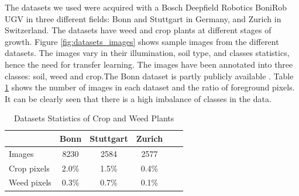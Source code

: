 \documentclass[letterpaper, 10 pt, conference]{ieeeconf}  %
\begin{document}
The datasets we used were acquired with a Bosch Deepfield Robotics BoniRob UGV in three different fields: Bonn and Stuttgart in Germany, and Zurich in Switzerland. The datasets have weed and crop plants at different stages of growth. Figure \ref{fig:datasets_images} shows sample images from the different datasets. The images vary in their illumination, soil type, and classes statistics, hence the need for transfer learning. The images have been annotated into three classes: soil, weed and crop.The Bonn dataset is partly publicly available \cite{chebrolu2017agricultural}. Table \ref{tab:datasets_stats} shows the number of images in each dataset and the ratio of foreground pixels. It can be clearly seen that there is a high imbalance of classes in the data.



    \begin{table}
        \vspace{1em}
        \centering
        \caption{Datasets Statistics of Crop and Weed Plants}
        \begin{tabular}{@{}lccccc@{}} 
            \toprule
              & Bonn & Stuttgart & Zurich \\ 
            \midrule 
    		  Images  & 8230 & 2584 & 2577 \\ \addlinespace
    		  Crop pixels & 2.0\% & 1.5\% & 0.4\%  \\ \addlinespace
    		  Weed pixels & 0.3\% & 0.7\% & 0.1\%  \\    
            \bottomrule
        \end{tabular}
        \label{tab:datasets_stats}
    \end{table}
    
    
    
\end{document}
